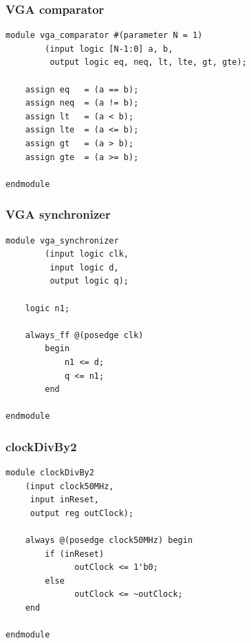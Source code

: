 \documentclass[a4paper]{article}
\begin{document}
\subsubsection{VGA comparator}

\begin{Verbatim}
module vga_comparator #(parameter N = 1)
		(input logic [N-1:0] a, b,
		 output logic eq, neq, lt, lte, gt, gte);

	assign eq	= (a == b);
	assign neq	= (a != b);
	assign lt	= (a < b);
	assign lte	= (a <= b);
	assign gt	= (a > b);
	assign gte	= (a >= b);

endmodule
\end{Verbatim}

\subsubsection{VGA synchronizer}

\begin{Verbatim}
module vga_synchronizer
		(input logic clk,
		 input logic d,
		 output logic q);

	logic n1;
	
	always_ff @(posedge clk)
		begin
			n1 <= d;
			q <= n1;
		end

endmodule
\end{Verbatim}

\subsubsection{clockDivBy2}

\begin{Verbatim}
module clockDivBy2
	(input clock50MHz,
	 input inReset,
	 output reg outClock);

	always @(posedge clock50MHz) begin
		if (inReset)
			  outClock <= 1'b0;
		else
			  outClock <= ~outClock;
	end

endmodule
\end{Verbatim}
\end{document}
